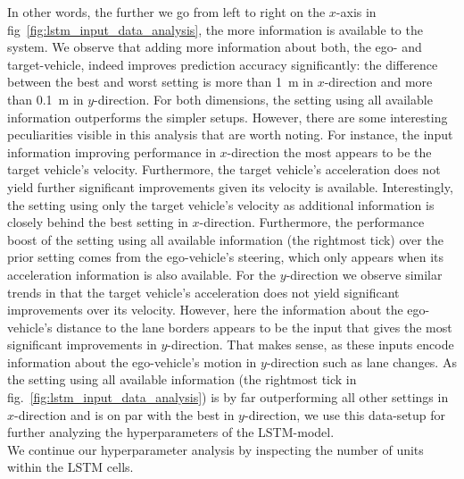 In other words, the further we go from left to right on the $x$-axis in fig~\ref{fig:lstm_input_data_analysis}, the more information is available to the system.
We observe that adding more information about both, the ego- and target-vehicle, indeed improves prediction accuracy significantly: the difference between the best and worst setting is more than \SI{1}{\meter} in $x$-direction and more than \SI{0.1}{\meter} in $y$-direction.
For both dimensions, the setting using all available information outperforms the simpler setups.
However, there are some interesting peculiarities visible in this analysis that are worth noting.
For instance, the input information improving performance in $x$-direction the most appears to be the target vehicle's velocity. 
Furthermore, the target vehicle's acceleration does not yield further significant improvements given its velocity is available.
Interestingly, the setting using only the target vehicle's velocity as additional information is closely behind the best setting in $x$-direction.
Furthermore, the performance boost of the setting using all available information (the rightmost tick) over the prior setting comes from the ego-vehicle's steering, which only appears when its acceleration information is also available.
For the $y$-direction we observe similar trends in that the target vehicle's acceleration does not yield significant improvements over its velocity.
However, here the information about the ego-vehicle's distance to the lane borders appears to be the input that gives the most significant improvements in $y$-direction.
That makes sense, as these inputs encode information about the ego-vehicle's motion in $y$-direction such as lane changes.
As the setting using all available information (the rightmost tick in fig.~\ref{fig:lstm_input_data_analysis}) is by far outperforming all other settings in $x$-direction and is on par with the best in $y$-direction, we use this data-setup for further analyzing the hyperparameters of the \ac{LSTM}-model.
\\
We continue our hyperparameter analysis by inspecting the number of units within the \ac{LSTM} cells.
